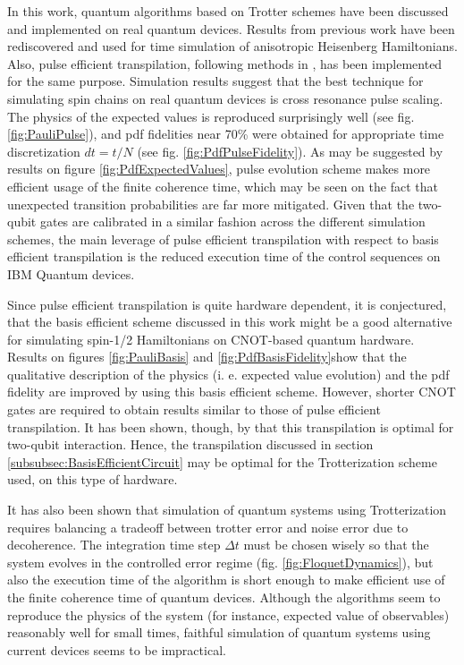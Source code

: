 In this work, quantum algorithms based on Trotter schemes have been discussed and implemented on real quantum devices. Results from previous work \cite{BellUniversalCartan} have been rediscovered and used for time simulation of anisotropic Heisenberg Hamiltonians. Also, pulse efficient transpilation, following methods in \cite{RXZPulseEfficient}, has been implemented for the same purpose. Simulation results suggest that the best technique for simulating spin chains on real quantum devices is cross resonance pulse scaling. The physics of the expected values is reproduced surprisingly well (see fig. \ref{fig:PauliPulse}), and pdf fidelities near 70\% were obtained for appropriate time discretization $dt = t/N$ (see fig. \ref{fig:PdfPulseFidelity}). As may be suggested by results on figure \ref{fig:PdfExpectedValues}, pulse evolution scheme makes more efficient usage of the finite coherence time, which may be seen on the fact that unexpected transition probabilities are far more mitigated. Given that the two-qubit gates are calibrated in a similar fashion across the different simulation schemes, the main leverage of pulse efficient transpilation with respect to basis efficient transpilation is the reduced execution time of the control sequences on IBM Quantum devices. 

Since pulse efficient transpilation is quite hardware dependent, it is conjectured, that the basis efficient scheme discussed in this work might be a good alternative for simulating spin-1/2 Hamiltonians on CNOT-based quantum hardware. Results on figures \ref{fig:PauliBasis} and \ref{fig:PdfBasisFidelity}show that the qualitative description of the physics (i. e. expected value evolution) and the pdf fidelity are improved by using this basis efficient scheme. However, shorter CNOT gates are required to obtain results similar to those of pulse efficient transpilation. It has been shown, though, by \cite{BellUniversalCartan} that this transpilation is optimal for two-qubit interaction. Hence, the transpilation discussed in section \ref{subsubsec:BasisEfficientCircuit} may be optimal for the Trotterization scheme used, on this type of hardware. 

It has also been shown that simulation of quantum systems using Trotterization requires balancing a tradeoff between trotter error and noise error due to decoherence. The integration time step $\Delta t$ must be chosen wisely so that the system evolves in the controlled error regime (fig. \ref{fig:FloquetDynamics}), but also the execution time of the algorithm is short enough to make efficient use of the finite coherence time of quantum devices. Although the algorithms seem to reproduce the physics of the system (for instance, expected value of observables) reasonably well for small times, faithful simulation of quantum systems using current devices seems to be impractical.

